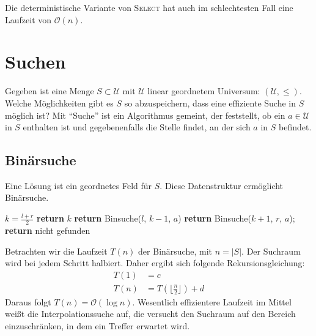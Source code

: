 \begin{Satz}
\hspace{\parindent}Die deterministische Variante von \textsc{Select} hat auch im schlechtesten Fall eine Laufzeit von $\mathcal{O}(n)$.
\end{Satz}

\section{Suchen}

Gegeben ist eine Menge $S \subset \mathcal{U}$ mit $\mathcal{U}$ linear geordnetem Universum: $(\mathcal{U}, \le)$. Welche Möglichkeiten gibt es $S$ so abzuspeichern, dass eine effiziente Suche in $S$ möglich ist? Mit "`Suche"' ist ein Algorithmus gemeint, der feststellt, ob ein $a \in \mathcal{U}$ in $S$ enthalten ist und gegebenenfalls die Stelle findet, an der sich $a$ in $S$ befindet.

\subsection{Binärsuche}
Eine Lösung ist ein geordnetes Feld für $S$. Diese Datenstruktur ermöglicht Binärsuche.


\begin{Alg}[Binärsuche]
\begin{algorithmic}[1]
    \State $k = \frac{l + r}{2}$
      \State \textbf{return} $k$
       \State \textbf{return} Binsuche($l$, $k-1$, $a$)
     \Else
       \State \textbf{return} Binsuche($k+1$, $r$, $a$);
    \EndIf
  \Else
    \State \textbf{return} nicht gefunden
  \EndIf
\EndFunction
\end{algorithmic}
\end{Alg}

Betrachten wir die Laufzeit $T(n)$ der Binärsuche, mit $n = |S|$. Der Suchraum wird bei jedem Schritt halbiert. Daher ergibt sich folgende Rekursionsgleichung:
\begin{align*}
  T(1) &= c\\
  T(n) &= T(\lfloor \frac{n}{2} \rfloor) + d
\end{align*}
Daraus folgt $T(n) = \mathcal{O}(\log n)$. Wesentlich effizientere Laufzeit im Mittel weißt die Interpolationssuche auf, die versucht den Suchraum auf den Bereich einzuschränken, in dem ein Treffer erwartet wird.

